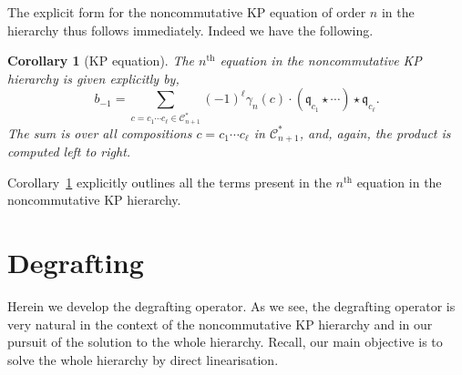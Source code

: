 \documentclass[5p,twocolumn]{elsarticle}
\newcommand*{\qf}{\mathfrak q}
\newtheorem{corollary}[theorem]{Corollary}
\begin{document}
%
The explicit form for the noncommutative KP equation of order $n$ in the hierarchy thus follows immediately. Indeed we have the following. 
%
\begin{corollary}[KP equation]\label{cor:KPequationformula}
The $n^{\mathrm{th}}$ equation in the noncommutative KP hierarchy is given explicitly by,
\begin{equation*}
   b_{-1}=\sum_{c=c_1\cdots c_\ell\in\mathcal C_{n+1}^\ast}(-1)^{\ell} \gamma_n(c)\cdot(\qf_{c_1}\star\cdots)\star\qf_{c_\ell}.
\end{equation*}
The sum is over all compositions $c=c_1\cdots c_\ell$ in $\mathcal C_{n+1}^\ast$, and, again, the product is computed left to right. 
\end{corollary}
%
Corollary~\ref{cor:KPequationformula} explicitly outlines all the terms present in the $n^{\mathrm{th}}$ equation in the noncommutative KP hierarchy.




\section{Degrafting}\label{sec:degrafting}
Herein we develop the degrafting operator. 
As we see, the degrafting operator is very natural in the context of the noncommutative KP hierarchy and in our pursuit of the solution to the whole hierarchy.
Recall, our main objective is to solve the whole hierarchy by direct linearisation.
\end{document}
